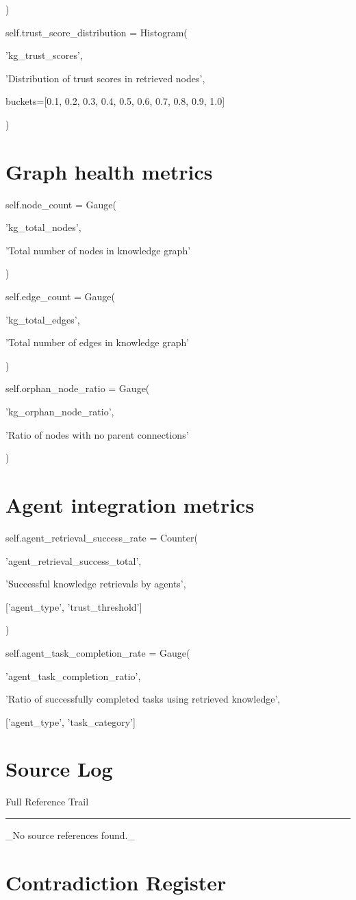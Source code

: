 \documentclass[a4paper,11pt]{article}
\newcommand{\ssubtitle}[1]{%
  \par\textcolor{subtitle}{\fontsize{12}{16}\selectfont #1}%
  \par\vspace{2pt}\textcolor{border}{\rule{\linewidth}{0.4pt}}\vspace{12pt}%
}
\begin{document}
)


self.trust\_score\_distribution = Histogram(

'kg\_trust\_scores',

'Distribution of trust scores in retrieved nodes',

buckets=[0.1, 0.2, 0.3, 0.4, 0.5, 0.6, 0.7, 0.8, 0.9, 1.0]

)


\section{Graph health metrics}
self.node\_count = Gauge(

'kg\_total\_nodes',

'Total number of nodes in knowledge graph'

)


self.edge\_count = Gauge(

'kg\_total\_edges',

'Total number of edges in knowledge graph'

)


self.orphan\_node\_ratio = Gauge(

'kg\_orphan\_node\_ratio',

'Ratio of nodes with no parent connections'

)


\section{Agent integration metrics}
self.agent\_retrieval\_success\_rate = Counter(

'agent\_retrieval\_success\_total',

'Successful knowledge retrievals by agents',

['agent\_type', 'trust\_threshold']

)


self.agent\_task\_completion\_rate = Gauge(

'agent\_task\_completion\_ratio',

'Ratio of successfully completed tasks using retrieved knowledge',

['agent\_type', 'task\_category']

\clearpage
\section{Source Log}
\ssubtitle{Full Reference Trail}

\_No source references found.\_



\section{Contradiction Register}
\end{document}
